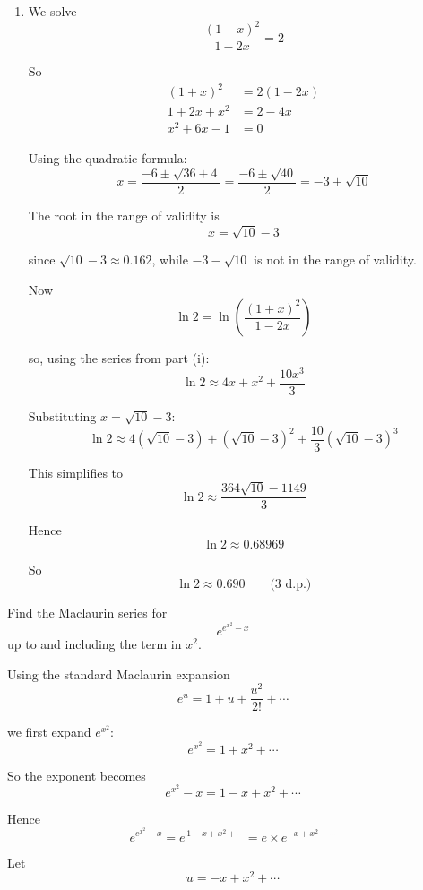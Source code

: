 \documentclass[leqno]{article}
\begin{document}
\begin{enumerate}[
  label=\textbf{\arabic*.},
  leftmargin=*,
  topsep=0pt,
  partopsep=0pt,
  parsep=0pt
]
\begin{djsSolution}
\begin{enumerate}[label=\textbf{(\roman*)}]
So the combined series is valid for
\[
-\frac12\le x<\frac12
\]

\item We solve
\[
\frac{(1+x)^2}{1-2x}=2
\]

So
\begin{align*}
(1+x)^2&=2(1-2x) \\
1+2x+x^2&=2-4x \\
x^2+6x-1&=0
\end{align*}

Using the quadratic formula:
\[
x=\frac{-6\pm\sqrt{36+4}}{2}=\frac{-6\pm\sqrt{40}}{2}=-3\pm\sqrt{10}
\]

The root in the range of validity is
\[
x=\sqrt{10}-3
\]

since \(\sqrt{10}-3\approx 0.162\), while \(-3-\sqrt{10}\) is not in the range of validity.

Now
\[
\ln 2=\ln\left(\frac{(1+x)^2}{1-2x}\right)
\]

so, using the series from part (i):
\[
\ln 2 \approx 4x+x^2+\frac{10x^3}{3}
\]

Substituting \(x=\sqrt{10}-3\):
\[
\ln 2 \approx 4(\sqrt{10}-3)+(\sqrt{10}-3)^2+\frac{10}{3}(\sqrt{10}-3)^3
\]

This simplifies to
\[
\ln 2 \approx \frac{364\sqrt{10}-1149}{3}
\]

Hence
\[
\ln 2 \approx 0.68969
\]

So
\[
\ln 2 \approx 0.690\qquad\text{(3 d.p.)}
\]
\end{enumerate}
\end{djsSolution}


\newpage

\questionitem

Find the Maclaurin series for \[e^{e^{x^2}-x}\] up to and including the term in $x^2$. 

\vspace*{10pt}

\begin{djsSolution}
Using the standard Maclaurin expansion
\[
e^u=1+u+\frac{u^2}{2!}+\cdots
\]

we first expand \(e^{x^2}\):
\[
e^{x^2}=1+x^2+\cdots
\]

So the exponent becomes
\[
e^{x^2}-x=1-x+x^2+\cdots
\]

Hence
\[
e^{e^{x^2}-x}=e^{\,1-x+x^2+\cdots}=e\times e^{-x+x^2+\cdots}
\]

Let
\[
u=-x+x^2+\cdots
\]


\end{djsSolution}
\end{enumerate}
\end{document}
